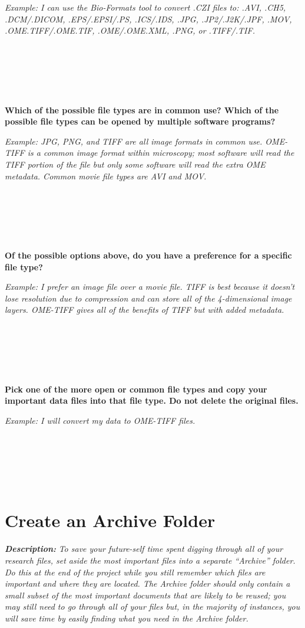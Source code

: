 \documentclass[
]{book}
\begin{document}
\emph{Example: I can use the Bio-Formats tool to convert .CZI files to: .AVI, .CH5, .DCM/.DICOM, .EPS/.EPSI/.PS, .ICS/.IDS, .JPG, .JP2/.J2K/.JPF, .MOV, .OME.TIFF/.OME.TIF, .OME/.OME.XML, .PNG, or .TIFF/.TIF.}

~

~

~

\textbf{Which of the possible file types are in common use? Which of the possible file types can be opened by multiple software programs?}

\emph{Example: JPG, PNG, and TIFF are all image formats in common use. OME-TIFF is a common image format within microscopy; most software will read the TIFF portion of the file but only some software will read the extra OME metadata. Common movie file types are AVI and MOV.}

~

~

~

\textbf{Of the possible options above, do you have a preference for a specific file type?}

\emph{Example: I prefer an image file over a movie file. TIFF is best because it doesn't lose resolution due to compression and can store all of the 4-dimensional image layers. OME-TIFF gives all of the benefits of TIFF but with added metadata.}

~

~

~

\textbf{Pick one of the more open or common file types and copy your important data files into that file type. Do not delete the original files.}

\emph{Example: I will convert my data to OME-TIFF files.}

~

~

~

\hypertarget{archive-folder}{%
\section{Create an Archive Folder}\label{archive-folder}}

\textbf{\emph{Description:}} \emph{To save your future-self time spent digging through all of your research files, set aside the most important files into a separate ``Archive'' folder. Do this at the end of the project while you still remember which files are important and where they are located. The Archive folder should only contain a small subset of the most important documents that are likely to be reused; you may still need to go through all of your files but, in the majority of instances, you will save time by easily finding what you need in the Archive folder.}
\end{document}
